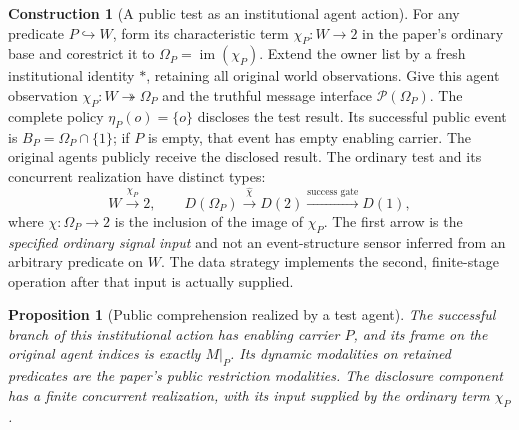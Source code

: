 \documentclass[11pt,a4paper]{article}
\numberwithin{equation}{section}
\newtheorem{proposition}[theorem]{Proposition}
\theoremstyle{definition}
\newtheorem{construction}[construction]{Construction}
\theoremstyle{remark}
\theoremstyle{plain}
\begin{document}
\begin{construction}[A public test as an institutional agent action]
\label{con:egt-institutional-public-test}
For any predicate $P\hookrightarrow W$, form its characteristic term
$\chi_P:W\to2$ in the paper's ordinary base and corestrict it to
$\Omega_P=\operatorname{im}(\chi_P)$. Extend the owner list by a fresh
institutional identity $\ast$, retaining all original world observations.
Give this agent observation $\chi_P:W\twoheadrightarrow\Omega_P$ and the
truthful message interface $\mathcal P(\Omega_P)$. The complete policy
$\eta_P(o)=\{o\}$ discloses the test result. Its successful public event is
$B_P=\Omega_P\cap\{1\}$; if $P$ is empty, that event has empty enabling
carrier. The original agents publicly receive the disclosed result.
The ordinary test and its concurrent realization have distinct types:
\[
 W\xrightarrow{\chi_P}2,
 \qquad
 D(\Omega_P)\xrightarrow{\widehat{\chi}}D(2)
 \xrightarrow{\text{success gate}}D(1),
\]
where $\chi:\Omega_P\to2$ is the inclusion of the image of $\chi_P$.
The first arrow is the \emph{specified ordinary signal input} and not
an event-structure sensor inferred from an arbitrary predicate on $W$.
The data strategy implements the second, finite-stage operation after
that input is actually supplied.
\end{construction}

\begin{proposition}[Public comprehension realized by a test agent]
\label{prop:egt-institutional-public-test}
The successful branch of this institutional action has enabling carrier
$P$, and its frame on the original agent indices is exactly $M|_P$.
Its dynamic modalities on retained predicates are the paper's public
restriction modalities. The disclosure component has a finite concurrent
realization, with its input supplied by the ordinary term $\chi_P$.
\end{proposition}
\end{document}
